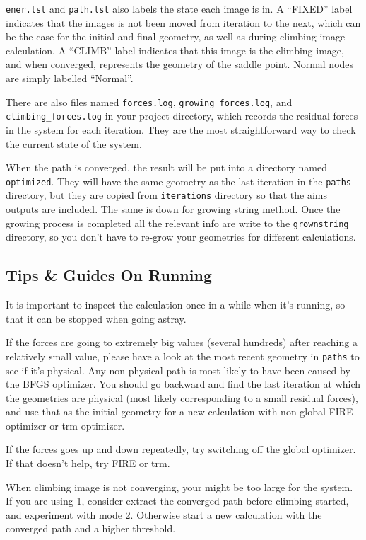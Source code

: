 \texttt{ener.lst} and \texttt{path.lst} also labels the state each image is in. A ``FIXED'' label indicates that the images is not been moved from iteration to the next, which can be the case for the initial and final geometry, as well as during climbing image calculation. A ``CLIMB'' label indicates that this image is the climbing image, and when converged, represents the geometry of the saddle point. Normal nodes are simply labelled ``Normal''.

There are also files named \texttt{forces.log}, \texttt{growing\_forces.log}, and \texttt{climbing\_forces.log} in your project directory, which records the residual forces in the system for each iteration. They are the most straightforward way to check the current state of the system. 

When the path is converged, the result will be put into a directory named \texttt{optimized}. They will have the same geometry as the last iteration in the \texttt{paths} directory, but they are copied from \texttt{iterations} directory so that the aims outputs are included. The same is down for growing string method. Once the growing process is completed all the relevant info are write to the \texttt{grownstring} directory, so you don't have to re-grow your geometries for different calculations. 

\subsection{Tips \& Guides On Running}
It is important to inspect the calculation once in a while when it's running, so that it can be stopped when going astray.


If the forces are going to extremely big values (several hundreds) after reaching a relatively small value, please have a look at the most recent geometry in \texttt{paths} to see if it's physical. Any non-physical path is most likely to have been caused by the BFGS optimizer. You should go backward and find the last iteration at which the geometries are physical (most likely corresponding to a small residual forces), and use that as the initial geometry for a new calculation with non-global FIRE optimizer or trm optimizer. 


If the forces goes up and down repeatedly, try switching off the global optimizer. If that doesn't help, try FIRE or trm. 


When climbing image is not converging, your  might be too large for the system. If you are using  1, consider extract the converged path before climbing started, and experiment with mode 2. Otherwise start a new calculation with the converged path and a higher threshold. 

